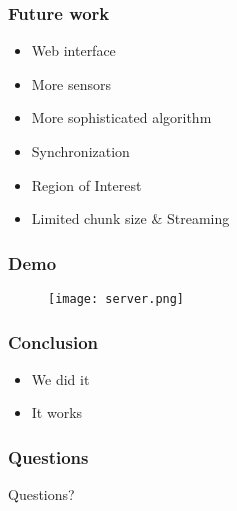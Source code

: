 \begin{frame}
	\frametitle{Future work}
	\begin{itemize}
		\item Web interface
		\item More sensors
		\item More sophisticated algorithm
		\item Synchronization
		\item Region of Interest
		\item Limited chunk size \& Streaming
	\end{itemize}
\end{frame}

\begin{frame}
	\frametitle{Demo}
		\begin{figure}[!t]
			\centering
			\texttt{[image: server.png]}
			\label{fig:server}
		\end{figure}
\end{frame}

\begin{frame}
	\frametitle{Conclusion}
	\begin{itemize}
		\item We did it
		\item It works
	\end{itemize}
\end{frame}

\begin{frame}
	\frametitle{Questions}
	\centering
	\LARGE Questions?
\end{frame}